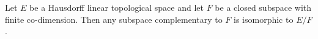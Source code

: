 Let $E$ be a Hausdorff linear topological space and let $F$ be a closed subspace with finite co-dimension. Then any subspace complementary to $F$ is isomorphic to $E/F$.
